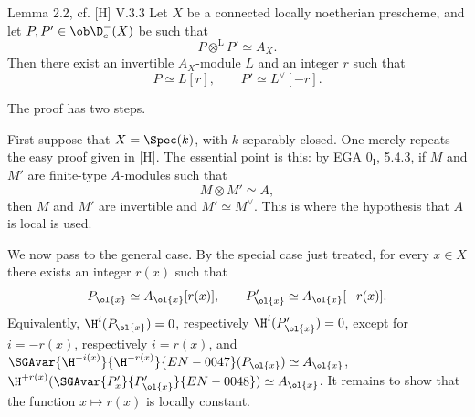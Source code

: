 \begin{statement}{Lemma 2.2, cf. [H] V.3.3}
Let $X$ be a connected locally noetherian prescheme, and let $P,P'\in\ob\D_c^-(X)$ be such that
\[
   P\otimes^{\mathrm L}P'\simeq A_X.
\]
Then there exist an invertible $A_X$-module $L$ and an integer $r$ such that
\[
   P\simeq L[r],\qquad P'\simeq L^\vee[-r].
\]
\end{statement}

\begin{prooftext}
The proof has two steps.

First suppose that $X=\Spec(k)$, with $k$ separably closed. One merely repeats the easy proof given in [H]. The essential point is this: by EGA $0_{\mathrm I}$, 5.4.3, if $M$ and $M'$ are finite-type $A$-modules such that
\[
   M\otimes M'\simeq A,
\]
then $M$ and $M'$ are invertible and $M'\simeq M^\vee$. This is where the hypothesis that $A$ is local is used.

We now pass to the general case. By the special case just treated, for every $x\in X$ there exists an integer $r(x)$ such that
\[
   P_{\ol{x}}\simeq A_{\ol{x}}[r(x)],\qquad
   P'_{\ol{x}}\simeq A_{\ol{x}}[-r(x)].
\]
Equivalently, $\H^i(P_{\ol{x}})=0$, respectively $\H^i(P'_{\ol{x}})=0$, except for $i=-r(x)$, respectively $i=r(x)$, and $\SGAvar{\H^{-i(x)}}{\H^{-r(x)}}{EN-0047}(P_{\ol{x}})\simeq A_{\ol{x}}$, $\H^{+r(x)}(\SGAvar{P'_{{x}}}{P'_{\ol{x}}}{EN-0048})\simeq A_{\ol{x}}$. It remains to show that the function $x\mapsto r(x)$ is locally constant.


\end{prooftext}
